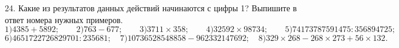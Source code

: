 24. Какие из результатов данных действий начинаются с цифры 1? Выпишите в ответ номера нужных примеров.\\
$1)4385+5892;\qquad 2)763-677;\qquad 3)3711\times358;\qquad4)32592\times98734;\qquad5) 74173787591475:356894725;$
$6)4651722726829701:235681;\quad7)10736528548858-962332147692;\quad8)329\times268-268\times273+56\times132.$\\
